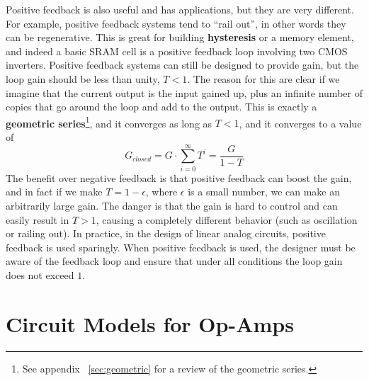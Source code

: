 Positive feedback is also useful and has applications, but they are very different.  For example, positive feedback systems tend to “rail out”, in other words they can be regenerative.  This is great for building \textbf{hysteresis} or a memory element, and indeed a basic SRAM cell is a positive feedback loop involving two CMOS inverters.  Positive feedback systems can still be designed to provide gain, but the loop gain should be less than unity, $T < 1$.  The reason for this are clear if we imagine that the current output is the input gained up, plus an infinite number of copies that go around the loop and add to the output.  This is exactly a \textbf{geometric series}\footnote{See appendix ~\ref{sec:geometric} for a review of the geometric series.}, and it converges as long as $T< 1$, and it converges to a value of
    \begin{equation}
        G_{closed} = G \cdot \sum_{i=0}^\infty T^i = \frac{G}{1 - T}
    \end{equation}
The benefit over negative feedback is that positive feedback can boost the gain, and in fact if we make $T = 1 - \epsilon$, where $\epsilon$ is a small number, we can make an arbitrarily large gain.  The danger is that the gain is hard to control and can easily result in $T > 1$, causing a completely different behavior (such as oscillation or railing out).  In practice, in the design of linear analog circuits, positive feedback is used sparingly.  When positive feedback is used, the designer must be aware of the feedback loop and ensure that under all conditions the loop gain does not exceed $1$.
\newpage
\section{Circuit Models for Op-Amps}
